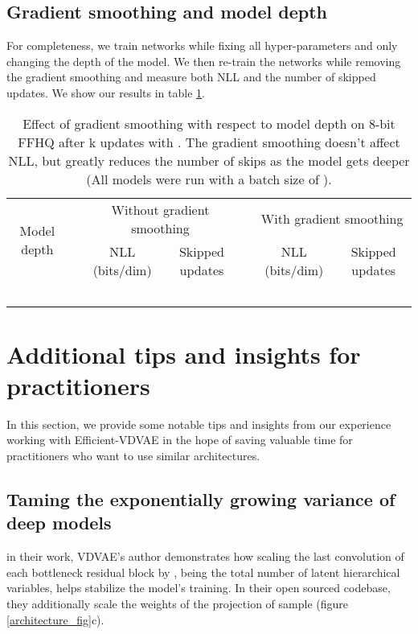 \documentclass{article}
\begin{document}
\subsection{Gradient smoothing and model depth}\label{depth_stability}
For completeness, we train networks while fixing all hyper-parameters and only changing the depth of the model. We then re-train the networks while removing the gradient smoothing and measure both NLL and the number of skipped updates. We show our results in table \ref{depth_stability_table}.

\begin{table}[]
\vskip 0.1in
\centering
\begin{tabular}{@{}ccccccc@{}}
\toprule
\multirow{2}{*}{Model depth} &
   & \multicolumn{2}{c}{Without gradient smoothing} &
   & \multicolumn{2}{c}{With gradient smoothing} \\ 
\cmidrule(){3-4} \cmidrule(){6-7} 
 && NLL (bits/dim) & Skipped updates && NLL (bits/dim) & Skipped updates \\ 
\midrule
 &&  &  &&  &  \\ 
 &&  &  &&  &  \\ 
 &&  &  &&  &  \\ 
 &&  &  &&  &  \\ 
 &&  &  &&  &  \\ 

\bottomrule
\end{tabular}
\caption{Effect of gradient smoothing with respect to model depth on 8-bit FFHQ  after k updates with . The gradient smoothing doesn't affect NLL, but greatly reduces the number of skips as the model gets deeper (All models were run with a batch size of ).}
\label{depth_stability_table}
\end{table}

\section{Additional tips and insights for practitioners}\label{tips_insights}
In this section, we provide some notable tips and insights from our experience working with Efficient-VDVAE in the hope of saving valuable time for practitioners who want to use similar architectures.

\subsection{Taming the exponentially growing variance of deep models}
in their work\cite{child2021very}, VDVAE's author demonstrates how scaling the last convolution of each bottleneck residual block by ,  being the total number of latent hierarchical variables, helps stabilize the model's training. In their open sourced codebase, they additionally scale the weights of the projection of sample  (figure \ref{architecture_fig}c).
\end{document}
